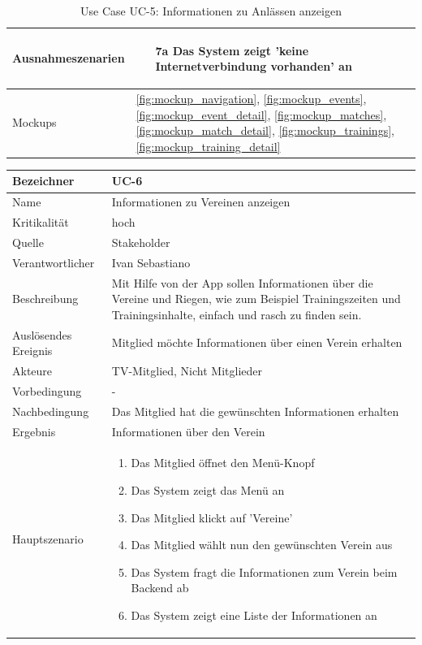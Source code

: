 \begin{table}[ht]
\begin{tabular}{ l | p{10cm} }
	Ausnahmeszenarien&	\begin{enumerate}
					\item[7a] Das System zeigt 'keine Internetverbindung vorhanden' an
					\end{enumerate}
					\\ \hline
	Mockups	 	&	\ref{fig:mockup_navigation}, \ref{fig:mockup_events}, \ref{fig:mockup_event_detail},
					\ref{fig:mockup_matches}, \ref{fig:mockup_match_detail}, \ref{fig:mockup_trainings}, 
					\ref{fig:mockup_training_detail}
  \end{tabular}
   \caption{Use Case UC-5: Informationen zu Anlässen anzeigen}\label{table:use_case_5}
\end{table}


\begin{table}[ht]
\centering
  \begin{tabular}{ l | p{10cm} }
	\hline
	\rowcolor{gray}
	Bezeichner		&	UC-6\\ \hline
	Name			&	Informationen zu Vereinen anzeigen\\ \hline
	Kritikalität		&	hoch\\ \hline
	Quelle			&	Stakeholder\\ \hline
	Verantwortlicher	&	Ivan Sebastiano\\ \hline
	Beschreibung	&	Mit Hilfe von der App sollen Informationen über die Vereine und Riegen, wie zum Beispiel Trainingszeiten und Trainingsinhalte, einfach und rasch zu finden sein.\\ \hline
	Auslösendes Ereignis&	Mitglied möchte Informationen über einen Verein erhalten\\ \hline
	Akteure		&	TV-Mitglied, Nicht Mitglieder\\ \hline
	Vorbedingung	&	-\\ \hline
	Nachbedingung	&	Das Mitglied hat die gewünschten Informationen erhalten\\ \hline
	Ergebnis		&	Informationen über den Verein\\ \hline
	Hauptszenario	&	\begin{enumerate}
					\item Das Mitglied öffnet den Menü-Knopf
					\item Das System zeigt das Menü an
					\item Das Mitglied klickt auf 'Vereine'
					\item Das Mitglied wählt nun den gewünschten Verein aus
					\item Das System fragt die Informationen zum Verein beim Backend ab
					\item Das System zeigt eine Liste der Informationen an

\end{enumerate}
\end{tabular}
\end{table}

